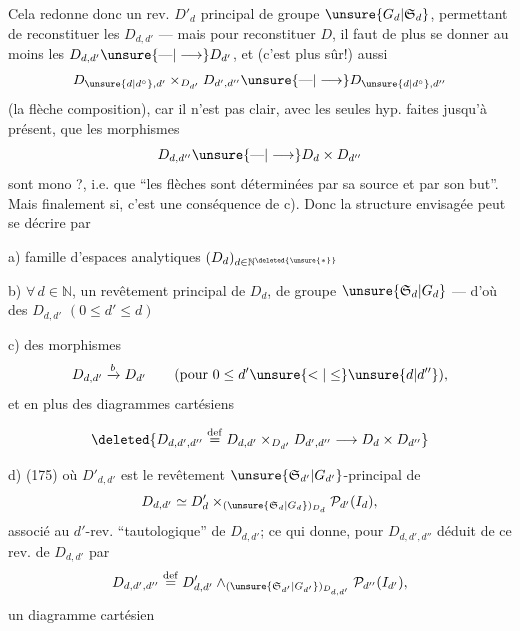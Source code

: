 Cela redonne donc un rev. $D'_d$ principal de groupe $\unsure{G_d|\mathfrak S_d}$, permettant de reconstituer les $D_{d,d'}$ --- mais pour reconstituer $D$, il faut de plus se donner  au moins les $D_{d,d'}\unsure{\text{---}|\longrightarrow}D_{d'}$, et (c'est plus sûr!) aussi
\[
D_{\unsure{d|d^\circ},d'}\mathbin{\times}_{D_{d'}}D_{d',d''}\unsure{\text{---}|\longrightarrow}D_{\unsure{d|d^\circ},d''}
\]
(la flèche composition), car il n'est pas clair, avec les seules hyp. faites jusqu'à présent, que les morphismes
\[
D_{d,d''}\unsure{\text{---}|\longrightarrow}D_d\times D_{d''}
\]
sont mono ?, i.e. que ``les flèches sont déterminées par sa source et par son but''. Mais finalement si, c'est une conséquence de c). Donc
la structure envisagée peut se décrire par

 a) famille d'espaces analytiques $(D_d)_{d\in\mathbb N^{\deleted{\unsure{*}}}}$

 b) $\forall\,d\in\mathbb N$, un revêtement principal  de $D_d$, de groupe $\unsure{\mathfrak S_d|G_d}$ --- d'où des $D_{d,d'}$ $(0\leq d'\leq d)$


 c) des morphismes
\[
D_{d,d'}\xrightarrow{b}D_{d'}\qquad(\text{pour }0\leq d'\unsure{<|\leq}\unsure{d|d''}),
\]
et en plus des diagrammes cartésiens

\[
\deleted{D_{d,d',d''}\overset{\mathrm{def}}{=}D_{d,d'}\mathbin\times_{D_{d'}}D_{d',d''}\longrightarrow D_d\mathbin\times D_{d''}}
\]

 d) \quad(175)
où $D'_{d,d'}$ est le revêtement $\unsure{\mathfrak S_{d'}|G_{d'}}$-principal de
\[
D_{d,d'}\simeq D'_d\mathbin\times_{(\unsure{\mathfrak S_d|G_d})_{D_d}}\mathcal P_{d'}(I_d),
\]
associé au $d'$-rev. ``tautologique'' de $D_{d,d'}$; ce qui donne, pour $D_{d,d',d''}$ déduit de ce rev. de $D_{d,d'}$ par
\[
D_{d,d',d''}\overset{\mathrm{def}}{=}D'_{d,d'}\mathbin\wedge_{(\unsure{\mathfrak S_{d'}|G_{d'}})_{D_{d,d'}}}\mathcal P_{d''}(I_{d'}),
\]
un  diagramme cartésien

